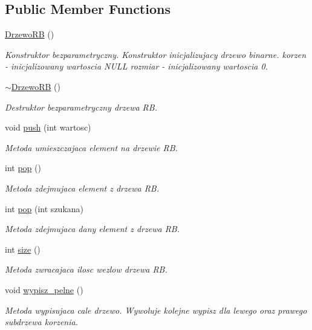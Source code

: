 \subsection*{Public Member Functions}
\begin{DoxyCompactItemize}
\item 
\hyperlink{a00011_a982a78031e87b68dba1684b279252363}{Drzewo\+R\+B} ()
\begin{DoxyCompactList}\small\item\em Konstruktor bezparametryczny. Konstruktor inicjalizujacy drzewo binarne. korzen -\/ inicjalizowany wartoscia N\+U\+L\+L rozmiar -\/ inicjalizowany wartoscia 0. \end{DoxyCompactList}\item 
\hyperlink{a00011_a082ad9993da4e5049017fe3b1b6c365f}{$\sim$\+Drzewo\+R\+B} ()
\begin{DoxyCompactList}\small\item\em Destruktor bezparametryczny drzewa R\+B. \end{DoxyCompactList}\item 
void \hyperlink{a00011_adcc6a12645ded929e467c7feff5574c9}{push} (int wartosc)
\begin{DoxyCompactList}\small\item\em Metoda umieszczajaca element na drzewie R\+B. \end{DoxyCompactList}\item 
int \hyperlink{a00011_af9d1c3f60b757b58077c650856574bac}{pop} ()
\begin{DoxyCompactList}\small\item\em Metoda zdejmujaca element z drzewa R\+B. \end{DoxyCompactList}\item 
int \hyperlink{a00011_ac7f83ae4239bfc9f4f9fee2d8aa9ef04}{pop} (int szukana)
\begin{DoxyCompactList}\small\item\em Metoda zdejmujaca dany element z drzewa R\+B. \end{DoxyCompactList}\item 
int \hyperlink{a00011_a71abda671520f9ea42c1fb0a80888f79}{size} ()
\begin{DoxyCompactList}\small\item\em Metoda zwracajaca ilosc wezlow drzewa R\+B. \end{DoxyCompactList}\item 
void \hyperlink{a00011_ac3374725a7a70d8bae28b7114c570563}{wypisz\+\_\+pelne} ()
\begin{DoxyCompactList}\small\item\em Metoda wypisujaca cale drzewo. Wywoluje kolejne wypisz dla lewego oraz prawego subdrzewa korzenia. \end{DoxyCompactList}\item 

\end{DoxyCompactItemize}

